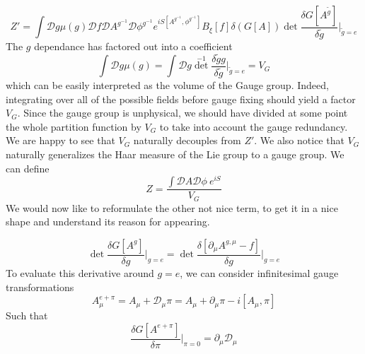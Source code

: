 \documentclass[a4paper]{book}
\theoremstyle{definition}
\theoremstyle{remark}
\begin{document}
\begin{equation}
    Z' = \int \mathcal D g \mu(g) \mathcal D f \mathcal D A^{g^{-1}} \mathcal D \phi^{g^{-1}} e^{iS[A^{g^{-1}}, \phi^{g^{-1}}]} B_\xi[f] \delta(G[A]) \det \frac{\delta G[A^{\tilde g}]}{\delta \tilde g} \Bigg|_{\tilde g = e} 
\end{equation}
The $g$ dependance has factored out into a coefficient 
\begin{equation}
    \int \mathcal D g \mu(g) = \int \mathcal D g \det^{-1} \frac{\delta \tilde g g}{\delta \tilde g}\Big|_{\tilde g = e} = V_G
\end{equation}
which can be easily interpreted as the volume of the Gauge group. Indeed, integrating over all of the possible fields before gauge fixing should yield a factor $V_G$. Since the gauge group is unphysical, we should have divided at some point the whole partition function by $V_G$ to take into account the gauge redundancy. We are happy to see that $V_G$ naturally decouples from $Z'$. We also notice that $V_G$ naturally generalizes the Haar measure of the Lie group to a gauge group. We can define 
\begin{equation}
    Z = \frac{\int \mathcal D A \mathcal D \phi~ e^{iS}}{V_G}
\end{equation}
We would now like to reformulate the other not nice term, to get it in a nice shape and understand its reason for appearing. 

\begin{equation}
    \det \frac{\delta G[A^{ g}]}{\delta  g} \Bigg|_{ g = e} = \det \frac{\delta [\partial_\mu A^{g,\mu} - f]}{\delta  g} \Bigg|_{ g = e}
\end{equation}
To evaluate this derivative around $g=e$, we can consider infinitesimal gauge transformations 
\begin{equation}
    A_\mu^{e+\pi} = A_\mu + \mathcal D _\mu \pi = A_\mu + \partial_\mu \pi - i[A_\mu, \pi]
\end{equation}
Such that 
\begin{equation}
    \frac{\delta G[A^{e+\pi}]}{\delta \pi} \Bigg|_{ \pi = 0} = \partial_\mu \mathcal D _\mu
\end{equation}
\end{document}
